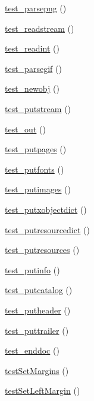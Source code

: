 \begin{DoxyCompactItemize}
\item 
\hyperlink{class_f_p_d_f_test_acb8f9e83c060ad33d3c2147af6d37f06}{test\_\-parsepng} ()
\item 
\hyperlink{class_f_p_d_f_test_afa1f3115925eb2bbe21999229e436ea4}{test\_\-readstream} ()
\item 
\hyperlink{class_f_p_d_f_test_ab8364fc0f5e8c885db9fa47d9681f92d}{test\_\-readint} ()
\item 
\hyperlink{class_f_p_d_f_test_af72e7607c068f8a80bda329a1b0e7159}{test\_\-parsegif} ()
\item 
\hyperlink{class_f_p_d_f_test_abbb3e91dda5b98c63b63c86840c9da28}{test\_\-newobj} ()
\item 
\hyperlink{class_f_p_d_f_test_af785ec3d8ea97c0aade2a69431d3a094}{test\_\-putstream} ()
\item 
\hyperlink{class_f_p_d_f_test_a263b95de6b1589a6968177b6f4e5bbba}{test\_\-out} ()
\item 
\hyperlink{class_f_p_d_f_test_a5702b175b1a43336d0535951ac4a52c2}{test\_\-putpages} ()
\item 
\hyperlink{class_f_p_d_f_test_a305b1672cfb0f28cd890b703c9082e56}{test\_\-putfonts} ()
\item 
\hyperlink{class_f_p_d_f_test_a6d869b2b1e1c07eb5069e970ec871deb}{test\_\-putimages} ()
\item 
\hyperlink{class_f_p_d_f_test_a2f8b1ef95fff501841f100f749a1f07d}{test\_\-putxobjectdict} ()
\item 
\hyperlink{class_f_p_d_f_test_aa986cecf3a66a65a53c428cd2aca622b}{test\_\-putresourcedict} ()
\item 
\hyperlink{class_f_p_d_f_test_a1779adfdb24275496427c9fe9c754a3b}{test\_\-putresources} ()
\item 
\hyperlink{class_f_p_d_f_test_a5a48e9f4563feee5eaf3a843f5307624}{test\_\-putinfo} ()
\item 
\hyperlink{class_f_p_d_f_test_ae9ce0876d92402b3af7bdddea902e183}{test\_\-putcatalog} ()
\item 
\hyperlink{class_f_p_d_f_test_a251ce2920be57d475e757d53bb86e6da}{test\_\-putheader} ()
\item 
\hyperlink{class_f_p_d_f_test_a464291a3e058de44a07fb6052e387c3c}{test\_\-puttrailer} ()
\item 
\hyperlink{class_f_p_d_f_test_a689d4b92b9535797510d9636bf22af3f}{test\_\-enddoc} ()
\item 
\hyperlink{class_f_p_d_f_test_a6865f0deae430866543f9cdf88d4843c}{testSetMargins} ()
\item 
\hyperlink{class_f_p_d_f_test_a34ec44d5f8dcf5bc3a6b6339255dfd1c}{testSetLeftMargin} ()

\end{DoxyCompactItemize}
